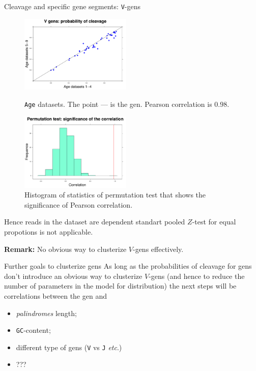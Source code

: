 \documentclass{beamer}\usepackage[]{graphicx}\usepackage[]{color}
\begin{document}
\begin{frame}{Cleavage and specific gene segments: \texttt{V}-gens}
 \begin{figure}[h]
  \begin{minipage}[h]{0.49\linewidth}
    \center\includegraphics[width=150pt]{Vgen_cleavage_age.pdf}
    \caption{\footnotesize{\texttt{Age} datasets. The point --- is the gen. Pearson correlation is $0.98$.}} 
  \end{minipage}
  \hfill
  \begin{minipage}[h]{0.49\linewidth}
   \includegraphics[width=150pt]{Vgen_cleavage_age_correlation.pdf}
    \caption{\footnotesize{Histogram of statistics of permutation test that shows the significance of Pearson correlation.}} 
  \end{minipage}
 \end{figure}
 \pause
 {\color{blue} Hence reads in the dataset are dependent standart pooled $Z$-test for equal propotions is not applicable.}
 \pause
 
 \textbf{Remark:} No obvious way to clusterize $V$-gens effectively.
\end{frame}

\begin{frame}{Further goals to clusterize gens}
  As long as the probabilities of cleavage for gens don't introduce an obvious way to clusterize $V$-gens (and hence to reduce the number of parameters in the model for distribution)
  the next steps will be correlations between the gen and
  \begin{itemize}
    \item \textit{palindromes} length;
    \item \texttt{GC}-content;
    \item different type of gens (\texttt{V} vs \texttt{J} \textit{etc}.)
    \item ???
  \end{itemize}
\end{frame}
\end{document}
